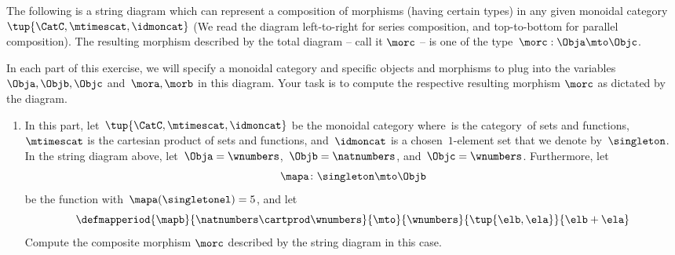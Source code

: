 \begin{gradedexercise}\label{ex:StringDiagrams}

    The following is a string diagram which can represent a composition of morphisms (having certain types) in any given monoidal category~$\tup{\CatC,\mtimescat,\idmoncat}$
    (We read the diagram left-to-right for series composition, and top-to-bottom for parallel composition).
    The resulting morphism described by the total diagram -- call it $\morc$ -- is one of the type~$\morc : \Obja \mto \Objc$.

    \begin{center}
        \label{eq:ExamStringDiagram1}
    \end{center}

    In each part of this exercise, we will specify a monoidal category and specific objects and morphisms to plug into the variables~$\Obja, \Objb, \Objc$ and~$\mora, \morb$ in this diagram.
    Your task is to compute the respective resulting morphism $\morc$ as dictated by the diagram.

    \begin{enumerate}
        \item In this part, let~$\tup{\CatC,\mtimescat,\idmoncat}$ be the monoidal category where~\CatC is the category~\Set of sets and functions,~$\mtimescat$ is the cartesian product of sets and functions, and~$\idmoncat$ is a chosen~$1$-element set that we denote by~$\singleton$.
              In the string diagram above, let~$\Obja = \wnumbers$,~$\Objb = \natnumbers$, and~$\Objc = \wnumbers$.
              Furthermore, let
              \begin{equation}
                  \mapa\colon \singleton \mto \Objb
              \end{equation}
              be the function with~$\mapa(\singletonel) = 5$, and let
              \begin{equation}
                  \defmapperiod{\mapb}{\natnumbers\cartprod \wnumbers}{\mto}{\wnumbers}{\tup{\elb,\ela}}{\elb+\ela}
              \end{equation}
              Compute the composite morphism $\morc$ described by the string diagram in this case.


\end{enumerate}
\end{gradedexercise}

